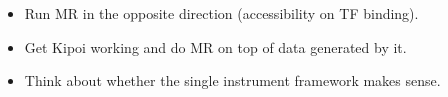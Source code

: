 \begin{Minutes}{}
\maketitle
{}%
\begin{itemize}
    \item Run MR in the opposite direction (accessibility on TF binding).
    \item Get Kipoi working and do MR on top of data generated by it.
    \item Think about whether the single instrument framework makes sense.
\end{itemize}


\end{Minutes}
